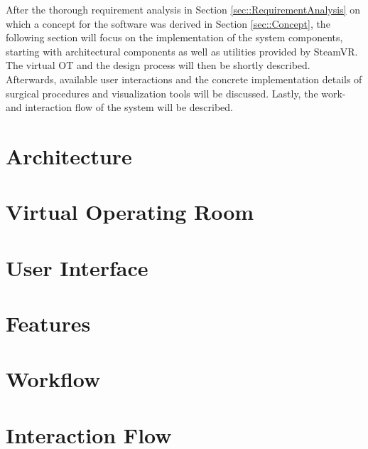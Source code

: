 After the thorough requirement analysis in Section \ref{sec::RequirementAnalysis} on which a concept for the software was derived in Section \ref{sec::Concept}, 
the following section will focus on the implementation of the system components, starting with architectural components as well as utilities provided by SteamVR.
The virtual OT and the design process will then be shortly described.
Afterwards, available user interactions and the concrete implementation details of surgical procedures and visualization tools will be discussed.
Lastly, the work- and interaction flow of the system will be described.

\section{\label{sec::Architecture}Architecture}

\section{\label{sec::VitualOperatingRoom}Virtual Operating Room}

\section{\label{sec::UserInterface}User Interface}

\section{\label{sec::Features}Features}

\section{\label{sec::Workflow}Workflow}

\section{\label{sec::InteractionFlow}Interaction Flow}
